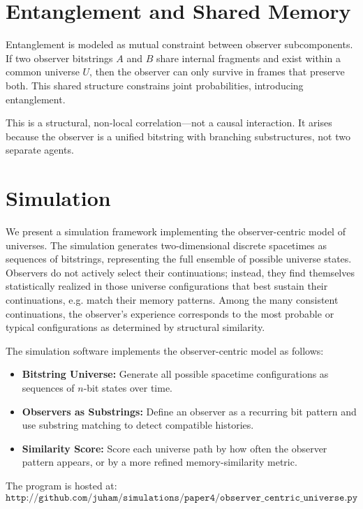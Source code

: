\documentclass[12pt]{article}
\begin{document}
\section{Entanglement and Shared Memory}

Entanglement is modeled as mutual constraint between observer subcomponents. If two observer bitstrings $A$ and $B$ share internal fragments and exist within a common universe $U$, then the observer can only survive in frames that preserve both. This shared structure constrains joint probabilities, introducing entanglement.

This is a structural, non-local correlation—not a causal interaction. It arises because the observer is a unified bitstring with branching substructures, not two separate agents.

\section{Simulation}

We present a simulation framework implementing the observer-centric model of universes. The simulation generates two-dimensional discrete spacetimes as sequences of bitstrings, representing the full ensemble of possible universe states. Observers do not actively select their continuations; instead, they find themselves statistically realized in those universe configurations that best sustain their continuations, e.g. match their memory patterns. Among the many consistent continuations, the observer's experience corresponds to the most probable or typical configurations as determined by structural similarity.

The simulation software implements the observer-centric model as follows:

\begin{itemize}
      \item \textbf{Bitstring Universe:} Generate all possible spacetime configurations as sequences of $n$-bit states over time.
      \item \textbf{Observers as Substrings:} Define an observer as a recurring bit pattern and use substring matching to detect compatible histories.
      \item \textbf{Similarity Score:} Score each universe path by how often the observer pattern appears, or by a more refined memory-similarity metric.
\end{itemize}

The program is hosted at:
\[
      \texttt{http://github.com/juham/simulations/paper4/observer\_centric\_universe.py}
\]
\end{document}

